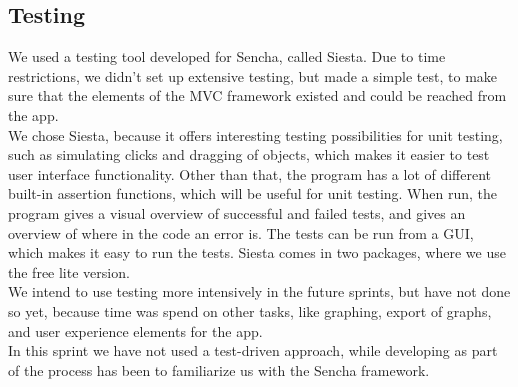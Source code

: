 \subsection{Testing} %
\label{sub:Testing}
We used a testing tool developed for Sencha, called Siesta. Due to time restrictions, we didn't set up extensive testing, but made a simple test, to make sure that the elements of the MVC framework existed and could be reached from the app. \\
We chose Siesta, because it offers interesting testing possibilities for unit testing, such as simulating clicks and dragging of objects, which makes it easier to test user interface functionality. Other than that, the program has a lot of different built-in assertion functions, which will be useful for unit testing. When run, the program gives a visual overview of successful and failed tests, and gives an overview of where in the code an error is. The tests can be run from a GUI, which makes it easy to run the tests.
Siesta comes in two packages, where we use the free lite version. \\
We intend to use testing more intensively in the future sprints, but have not done so yet, because time was spend on other tasks, like graphing, export of graphs, and user experience elements for the app. \\
In this sprint we have not used a test-driven approach, while developing as part of the process has been to familiarize us with the Sencha framework.
